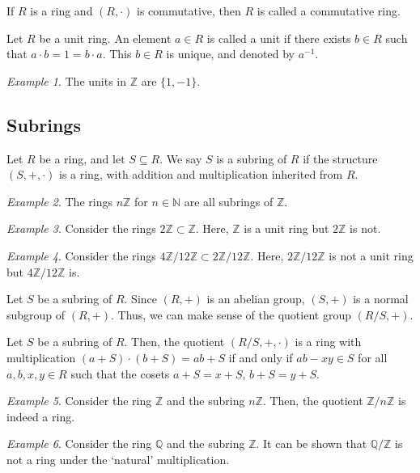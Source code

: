 \documentclass[11pt]{article}
\newcommand{\Q}{\mathbb{Q}}
\newcommand{\Z}{\mathbb{Z}}
\newcommand{\N}{\mathbb{N}}
\theoremstyle{definition}
\theoremstyle{remark}
\newtheorem*{example}{Example}
\numberwithin{equation}{section}
\begin{document}
    \begin{definition}
        If $R$ is a ring and $(R, \cdot)$ is commutative, then $R$ is called a
        commutative ring.
    \end{definition}

    \begin{definition}
        Let $R$ be a unit ring. An element $a \in R$ is called a unit if there exists
        $b \in R$ such that $a\cdot b = 1 = b\cdot a$. This $b \in R$ is unique, and
        denoted by $a^{-1}$.
    \end{definition}
    \begin{example}
        The units in $\Z$ are $\{1, -1\}$.
    \end{example}


    \subsection{Subrings}

    \begin{definition}
        Let $R$ be a ring, and let $S \subseteq R$. We say $S$ is a subring of $R$ if
        the structure $(S, +, \cdot)$ is a ring, with addition and multiplication
        inherited from $R$.
    \end{definition}
    \begin{example}
        The rings $n\Z$ for $n \in \N$ are all subrings of $\Z$.
    \end{example}
    \begin{example}
        Consider the rings $2\Z \subset \Z$. Here, $\Z$ is a unit ring but $2\Z$ is
        not.
    \end{example}
    \begin{example}
        Consider the rings $4\Z/12\Z \subset 2\Z/12\Z$. Here, $2\Z/12\Z$ is not a
        unit ring but $4\Z/12\Z$ is.
    \end{example}

    \begin{lemma}
        Let $S$ be a subring of $R$. Since $(R, +)$ is an abelian group, $(S, +)$ is
        a normal subgroup of $(R, +)$. Thus, we can make sense of the quotient group
        $(R/S, +)$.
    \end{lemma}

    \begin{lemma}
        Let $S$ be a subring of $R$. Then, the quotient $(R/S, +, \cdot)$ is a ring
        with multiplication $(a + S)\cdot(b + S) = ab + S$ if and only if $ab - xy
        \in S$ for all $a, b, x, y \in R$ such that the cosets $a + S = x + S$, $b +
        S = y + S$.
    \end{lemma}
    \begin{example}
        Consider the ring $\Z$ and the subring $n\Z$. Then, the quotient $\Z/n\Z$ is
        indeed a ring.
    \end{example}
    \begin{example}
        Consider the ring $\Q$ and the subring $\Z$. It can be shown that $\Q/\Z$ is
        not a ring under the `natural' multiplication.
    \end{example}
\end{document}
